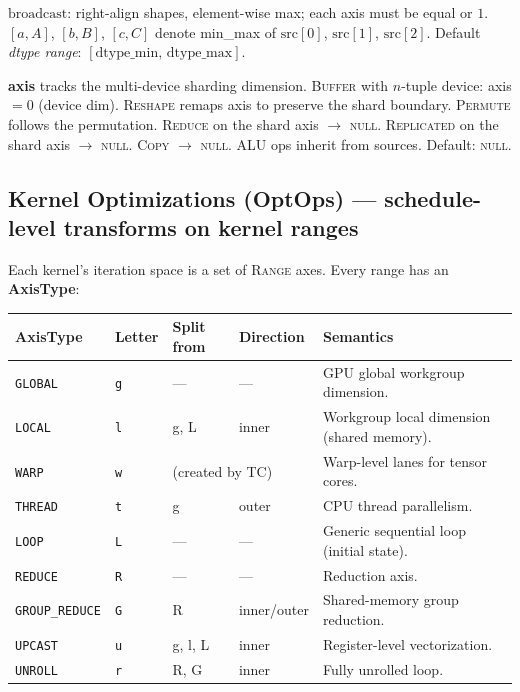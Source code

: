 \documentclass[10pt,letterpaper]{article}
\newcommand{\op}[1]{\textsc{#1}}
\begin{document}
\smallskip
$\mathrm{broadcast}$: right-align shapes, element-wise max; each axis must be equal or $1$.
$[a,A]$, $[b,B]$, $[c,C]$ denote min\_max of $\mathrm{src}[0]$, $\mathrm{src}[1]$, $\mathrm{src}[2]$.
Default \emph{dtype range}: $[\mathrm{dtype\_min},\, \mathrm{dtype\_max}]$.

\medskip
\textbf{axis} tracks the multi-device sharding dimension. \op{Buffer} with $n$-tuple device: axis $= 0$ (device dim).
\op{Reshape} remaps axis to preserve the shard boundary. \op{Permute} follows the permutation.
\op{Reduce} on the shard axis $\to$ \textsc{null}. \op{Replicated} on the shard axis $\to$ \textsc{null}. \op{Copy} $\to$ \textsc{null}. ALU ops inherit from sources. Default: \textsc{null}.

\subsection*{Kernel Optimizations (OptOps) \normalfont\small--- schedule-level transforms on kernel ranges}

Each kernel's iteration space is a set of \op{Range} axes. Every range has an \textbf{AxisType}:

\medskip
\begin{tabular}{@{}l l l l l@{}}
\toprule
\textbf{AxisType} & \textbf{Letter} & \textbf{Split from} & \textbf{Direction} & \textbf{Semantics} \\
\midrule
{\color{axblue}\texttt{GLOBAL}} & \texttt{g} & --- & --- & GPU global workgroup dimension. \\
{\color{axcyan}\texttt{LOCAL}} & \texttt{l} & g, L & inner & Workgroup local dimension (shared memory). \\
{\color{axbrcyan}\texttt{WARP}} & \texttt{w} & \multicolumn{2}{l}{(created by \op{TC})} & Warp-level lanes for tensor cores. \\
{\color{axbrblue}\texttt{THREAD}} & \texttt{t} & g & outer & CPU thread parallelism. \\
{\color{axwhite}\texttt{LOOP}} & \texttt{L} & --- & --- & Generic sequential loop (initial state). \\
{\color{axred}\texttt{REDUCE}} & \texttt{R} & --- & --- & Reduction axis. \\
{\color{axbrred}\texttt{GROUP\_REDUCE}} & \texttt{G} & R & inner/outer & Shared-memory group reduction. \\
{\color{axyellow}\texttt{UPCAST}} & \texttt{u} & g, l, L & inner & Register-level vectorization. \\
{\color{axmagenta}\texttt{UNROLL}} & \texttt{r} & R, G & inner & Fully unrolled loop. \\
\bottomrule
\end{tabular}
\end{document}
